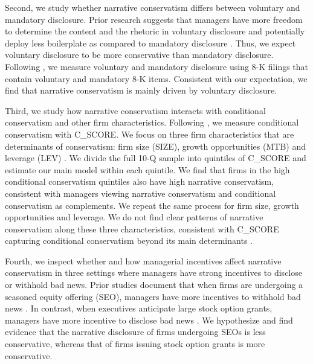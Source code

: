 \documentclass[letterpaper,12pt]{article}
\begin{document}
\begin{spacing}{1.5}
Second, we study whether narrative conservatism differs between voluntary and mandatory disclosure. Prior research suggests that managers have more freedom to determine the content and the rhetoric in voluntary disclosure and potentially deploy less boilerplate as compared to mandatory disclosure \cite{nelsonCarrotStickShift2016}. Thus, we expect voluntary disclosure to be more conservative than mandatory disclosure. Following , we measure voluntary and mandatory disclosure using 8-K filings that contain voluntary and mandatory 8-K items. Consistent with our expectation, we find that narrative conservatism is mainly driven by voluntary disclosure. 

Third, we study how narrative conservatism interacts with conditional conservatism and other firm characteristics. Following , we measure conditional conservatism with C\_SCORE. We focus on three firm characteristics that are determinants of conservatism: firm size (SIZE), growth opportunities (MTB) and leverage (LEV) \cite{wattsConservatismAccountingPart2003, qiangEffectsContractingLitigation2007, khanEstimationEmpiricalProperties2009, laraEconomicDeterminantsConditional2009}. We divide the full 10-Q sample into quintiles of C\_SCORE and estimate our main model within each quintile. We find that firms in the high conditional conservatism quintiles also have high narrative conservatism, consistent with managers viewing narrative conservatism and conditional conservatism as complements. We repeat the same process for firm size, growth opportunities and leverage. We do not find clear patterns of narrative conservatism along these three characteristics, consistent with C\_SCORE capturing conditional conservatism beyond its main determinants \cite{khanEstimationEmpiricalProperties2009}.

Fourth, we inspect whether and how managerial incentives affect narrative conservatism in three settings where managers have strong incentives to disclose or withhold bad news. Prior studies document that when firms are undergoing a seasoned equity offering (SEO), managers have more incentives to withhold bad news \cite{teohEarningsManagementUnderperformance1998, langVoluntaryDisclosureEquity2000}. In contrast, when executives anticipate large stock option grants, managers have more incentive to disclose bad news \cite{yermackGoodTimingCEO1997, aboodyCEOStockOption2000}. We hypothesize and find evidence that the narrative disclosure of firms undergoing SEOs is less conservative, whereas that of firms issuing stock option grants is more conservative.


\end{spacing}
\end{document}
